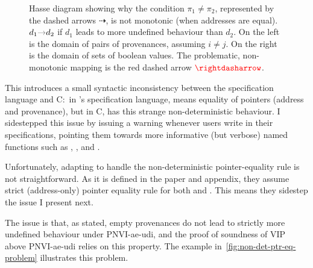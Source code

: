 \begin{figure*}
%
\caption{Hasse diagram showing why the condition {\color{red}$\pi_1 \neq \pi_2$},
    represented by the dashed arrows $\rightdasharrow$, is not monotonic (when
    addresses are equal). $d_1 {\color{gray}\rightarrow} d_2$ if $d_1$ leads to
    more undefined behaviour than $d_2$. On the left is the domain of pairs of
    provenances, assuming $i \neq j$. On the right is the domain of sets of
    boolean values. The problematic, non-monotonic mapping is the red dashed
    arrow $\color{red}\rightdasharrow$.}\label{fig:ptr-eq-hasse}
\end{figure*}

This introduces a small syntactic inconsistency between the specification
language and C:\ in 's specification language, \cninline{==} means
equality of pointers (address and provenance), but in C, \cinline{==} has
this strange non-deterministic behaviour. I sidestepped this issue by issuing a
warning whenever users write \cninline{==} in their specifications, pointing
them towards more informative (but verbose) named functions such as
, , and .

Unfortunately, adapting  to handle the non-deterministic
pointer-equality rule is not straightforward. As it is defined in the paper and
appendix, they assume strict (address-only) pointer equality rule for both
 and . This means they sidestep the issue I present
next.

The issue is that, as stated, empty provenances do not lead to strictly more
undefined behaviour under PNVI-ae-udi, and the proof of soundness of VIP above
PNVI-ae-udi relies on this property. The example
in~\cref{fig:non-det-ptr-eq-problem} illustrates this problem.

